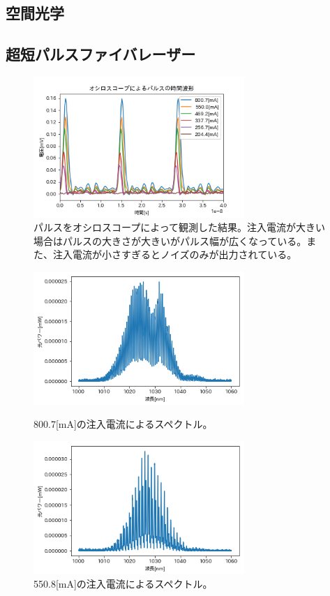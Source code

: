 \documentclass[titlepage]{jsarticle}
\begin{document}
\subsection{空間光学}

\subsection{超短パルスファイバレーザー}
\begin{figure}[htbp]
 \begin{minipage}{0.5\hsize}
  \begin{center}
   \includegraphics[width=80mm]{palse_osiro.png}
  \end{center}
  \caption{パルスをオシロスコープによって観測した結果。注入電流が大きい場合はパルスの大きさが大きいがパルス幅が広くなっている。また、注入電流が小さすぎるとノイズのみが出力されている。}
  \label{} \end{minipage}
\end{figure}
\begin{figure}[htbp]
 \begin{minipage}{0.5\hsize}
  \begin{center}
   \includegraphics[width=80mm]{800_7[mA].png}
  \end{center}
  \caption{800.7[mA]の注入電流によるスペクトル。}
  \label{fig:800_7}
 \end{minipage}
 \begin{minipage}{0.5\hsize}
  \begin{center}
   \includegraphics[width=80mm]{550_8[mA].png}
  \end{center}
  \caption{550.8[mA]の注入電流によるスペクトル。}
  \label{fig:550_8}
 \end{minipage}
\end{figure}
\end{document}
